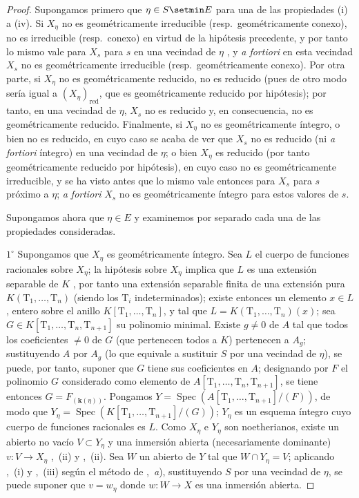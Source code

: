 \begin{proof}
Supongamos primero que $\eta\in S\setmin E$ para una de las propiedades (i) a (iv).
Si $X_\eta$ no es geométricamente irreducible (resp.\ geométricamente conexo), no es irreducible (resp.\ conexo) en virtud de la hipótesis precedente, y por tanto lo mismo vale para $X_s$ para $s$ en una vecindad de $\eta$ , y \emph{a fortiori} en esta vecindad $X_s$ no es geométricamente irreducible (resp.\ geométricamente conexo).
Por otra parte, si $X_\eta$ no es geométricamente reducido, no es reducido (pues de otro modo sería igual a $(X_\eta)_{\mathrm{red}}$, que es geométricamente reducido por hipótesis); por tanto, en una vecindad de $\eta$, $X_s$ no es reducido  y, en consecuencia, no es geométricamente reducido.
Finalmente, si $X_\eta$ no es geométricamente íntegro, o bien no es reducido, en cuyo caso se acaba de ver que $X_s$ no es reducido (ni \emph{a fortiori} íntegro) en una vecindad de $\eta$; o bien $X_\eta$ es reducido (por tanto geométricamente reducido por hipótesis), en cuyo caso no es geométricamente irreducible, y se ha visto antes que lo mismo vale entonces para $X_s$ para $s$ próximo a $\eta$; \emph{a fortiori} $X_s$ no es geométricamente íntegro para estos valores de $s$.

Supongamos ahora que $\eta\in E$ y examinemos por separado cada una de las propiedades consideradas.

$1^\circ$ Supongamos que $X_\eta$ es geométricamente íntegro.
Sea $L$ el cuerpo de funciones racionales sobre $X_\eta$; la hipótesis sobre $X_\eta$ implica que $L$ es una extensión separable de $K$ , por tanto una extensión separable finita de una extensión pura $K(\mathrm T_1,\ldots,\mathrm T_n)$ (siendo los $\mathrm T_i$ indeterminados); existe entonces un elemento $x\in L$, entero sobre el anillo $K[\mathrm T_1,\ldots,\mathrm T_n]$, y tal que $L=K(\mathrm T_1,\ldots,\mathrm T_n)(x)$; sea $G\in K[\mathrm T_1,\ldots,\mathrm T_n,\mathrm T_{n+1}]$ su polinomio minimal.
Existe $g\neq0$ de $A$ tal que todos los coeficientes $\neq0$ de $G$ (que pertenecen todos a $K$) pertenecen a $A_g$; sustituyendo $A$ por $A_g$ (lo que equivale a sustituir $S$ por una vecindad de $\eta$), se puede, por tanto, suponer que $G$ tiene sus coeficientes en $A$; designando por $F$ el polinomio $G$ considerado como elemento de $A[\mathrm T_1,\ldots,\mathrm T_n,\mathrm T_{n+1}]$, se tiene entonces $G=F_{(\mathbf{k}(\eta))}$.
Pongamos $Y=\operatorname{Spec}(A[\mathrm T_1,\ldots,\mathrm T_{n+1}]/(F))$, de modo que $Y_\eta=\operatorname{Spec}(K[\mathrm T_1,\ldots,\mathrm T_{n+1}]/(G))$; $Y_\eta$ es un esquema íntegro cuyo cuerpo de funciones racionales es $L$.
Como $X_\eta$ e $Y_\eta$ son noetherianos, existe un abierto no vacío $V\subset Y_\eta$ y una inmersión abierta (necesariamente dominante) $v:V\to X_\eta$ ,~(ii) y ,~(ii).
Sea $W$ un abierto de $Y$ tal que $W\cap Y_\eta=V$; aplicando ,~(i) y ,~(iii) según el método de ,~\emph{a}), sustituyendo $S$ por una vecindad de $\eta$, se puede suponer que $v=w_\eta$ donde $w:W\to X$ es una inmersión abierta.


\end{proof}
